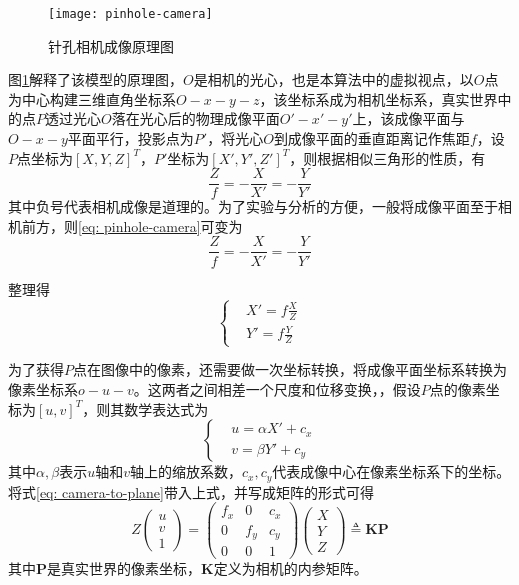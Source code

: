 \begin{figure}
	\centering
	\texttt{[image: pinhole-camera]}
	\caption{针孔相机成像原理图}
	\label{pinhole-camera}
\end{figure}

图\ref{pinhole-camera}解释了该模型的原理图，$O$是相机的光心，也是本算法中的虚拟视点，以$O$点为中心构建三维直角坐标系$O-x-y-z$，该坐标系成为相机坐标系，真实世界中的点$P$透过光心$O$落在光心后的物理成像平面$O'-x'-y'$上，该成像平面与$O-x-y$平面平行，投影点为$P'$，将光心$O$到成像平面的垂直距离记作焦距$f$，设$P$点坐标为$[X,Y,Z]^T$，$P'$坐标为$[X',Y',Z']^T$，则根据相似三角形的性质，有
\begin{equation}
	\label{eq: pinhole-camera}
	\frac{Z}{f}=-\frac{X}{X'}=-\frac{Y}{Y'}
\end{equation}
其中负号代表相机成像是道理的。为了实验与分析的方便，一般将成像平面至于相机前方，则\ref{eq: pinhole-camera}可变为
\begin{equation}
	\frac{Z}{f}=-\frac{X}{X'}=-\frac{Y}{Y'}
\end{equation}

整理得
\begin{equation}
	\label{eq: camera-to-plane}
	\left\{
	\begin{aligned}
		& X' = f\frac{X}{Z} \\
		& Y' = f\frac{Y}{Z}
	\end{aligned}
	\right.
\end{equation}

为了获得$P$点在图像中的像素，还需要做一次坐标转换，将成像平面坐标系转换为像素坐标系$o-u-v$。这两者之间相差一个尺度和位移变换，，假设$P$点的像素坐标为$[u,v]^T$，则其数学表达式为
\begin{equation}
	\label{eq: pinhole-tranform}
	\left\{
	\begin{aligned}
		& u = \alpha X'+ c_x\\
		& v = \beta Y' + c_y
	\end{aligned}
	\right.
\end{equation}
其中$\alpha, \beta$表示$u$轴和$v$轴上的缩放系数，$c_x, c_y$代表成像中心在像素坐标系下的坐标。将式\ref{eq: camera-to-plane}带入上式，并写成矩阵的形式可得
\begin{equation}
	\label{eq: world-to-camera}
	Z\begin{pmatrix}u\\v\\1\end{pmatrix}=
	\begin{pmatrix}
		f_x & 0 & c_x\\
		0 & f_y & c_y\\
		0 & 0 & 1
	\end{pmatrix}
	\begin{pmatrix}X\\Y\\Z\end{pmatrix}
	\triangleq \boldsymbol{KP}
\end{equation}
其中$\boldsymbol{P}$是真实世界的像素坐标，$\boldsymbol{K}$定义为相机的内参矩阵。

